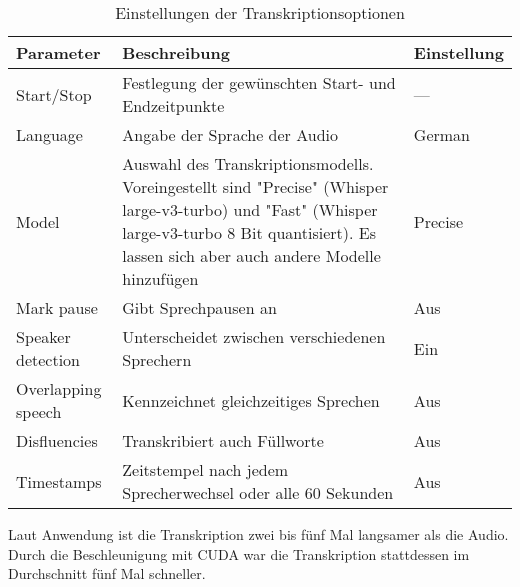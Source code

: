 \begin{table}
    \centering
    \begin{tabulary}{\textwidth}{lLl}
        \toprule
        \textbf{Parameter} & \textbf{Beschreibung} & \textbf{Einstellung} \\
        \midrule
        Start/Stop & Festlegung der gewünschten Start- und Endzeitpunkte & --- \\
        Language & Angabe der Sprache der Audio & German \\
        Model & Auswahl des Transkriptionsmodells. Voreingestellt sind "Precise" (Whisper large-v3-turbo) und "Fast" (Whisper large-v3-turbo 8 Bit quantisiert). Es lassen sich aber auch andere Modelle hinzufügen & Precise \\
        Mark pause & Gibt Sprechpausen an & Aus \\
        Speaker detection & Unterscheidet zwischen verschiedenen Sprechern & Ein \\
        Overlapping speech & Kennzeichnet gleichzeitiges Sprechen & Aus \\
        Disfluencies & Transkribiert auch Füllworte & Aus \\
        Timestamps & Zeitstempel nach jedem Sprecherwechsel oder alle 60 Sekunden & Aus \\
        \bottomrule
    \end{tabulary}
    \caption{Einstellungen der Transkriptionsoptionen}
    \label{tab:transkription_einstellungen}
\end{table}


Laut Anwendung ist die Transkription zwei bis fünf Mal langsamer als die Audio.
Durch die Beschleunigung mit CUDA war die Transkription stattdessen im Durchschnitt fünf Mal schneller.